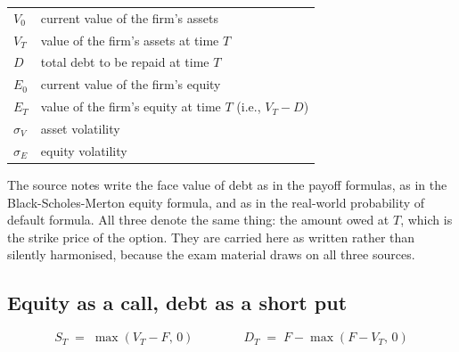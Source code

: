 \begin{crkeybox}
\begin{tabular}{L{1.9cm} L{12.6cm}}
$V_0$ & current value of the firm's assets \\
$V_T$ & value of the firm's assets at time $T$ \\
$D$ & total debt to be repaid at time $T$ \\
$E_0$ & current value of the firm's equity \\
$E_T$ & value of the firm's equity at time $T$ (i.e., $V_T - D$) \\
$\sigma_V$ & asset volatility \\
$\sigma_E$ & equity volatility \\
\end{tabular}
\end{crkeybox}

\begin{crtrapbox}
The source notes write the face value of debt as  in the payoff formulas,
as  in the Black-Scholes-Merton equity formula, and as  in the
real-world probability of default formula. All three denote the same thing: the
amount owed at $T$, which is the strike price of the option. They are carried
here as written rather than silently harmonised, because the exam material draws
on all three sources.
\end{crtrapbox}

\subsection*{Equity as a call, debt as a short put}

\begin{crfmlbox}
\[ S_T \;=\; \max(V_T - F,\,0) \qquad\qquad D_T \;=\; F - \max(F - V_T,\,0) \]
\end{crfmlbox}

